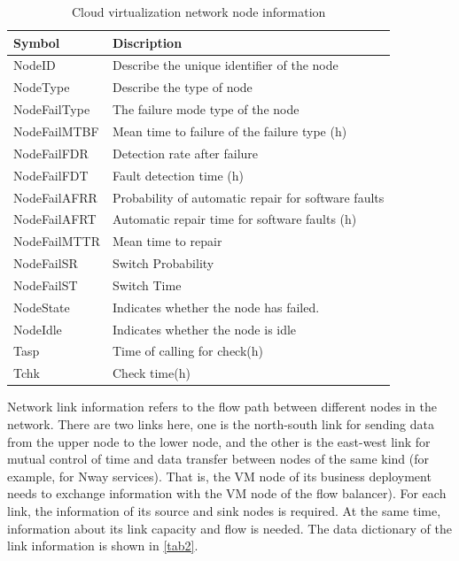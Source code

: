 \documentclass[journal]{IEEEtran}
\begin{document}
    \begin{table}[!t]
        \renewcommand{\arraystretch}{1.3}
        \caption{Cloud virtualization network node information}
        \label{tab1}
        \centering
        \begin{tabular}{|l||l|}
            \hline
            Symbol       & Discription                                         \\
            \hline
            NodeID       & Describe the unique identifier of the node          \\
            NodeType     & Describe the type of node                           \\
            NodeFailType & The failure mode type of the node                   \\
            NodeFailMTBF & Mean time to failure of the failure type (h)        \\
            NodeFailFDR  & Detection rate after failure                        \\
            NodeFailFDT  & Fault detection time (h)                            \\
            NodeFailAFRR & Probability of automatic repair for software faults \\
            NodeFailAFRT & Automatic repair time for software faults (h)       \\
            NodeFailMTTR & Mean time to repair                                 \\
            NodeFailSR   & Switch Probability                                  \\
            NodeFailST   & Switch Time                                         \\
            NodeState    & Indicates whether the node has failed.              \\
            NodeIdle     & Indicates whether the node is idle                  \\
            Tasp         & Time of calling for check(h)                        \\
            Tchk         & Check time(h)                                       \\
            \hline
        \end{tabular}
    \end{table}

    Network link information refers to the flow path between different nodes in the network. There are two links here, one is the north-south link for sending data from the upper node to the lower node, and the other is the east-west link for mutual control of time and data transfer between nodes of the same kind (for example, for Nway services). That is, the VM node of its business deployment needs to exchange information with the VM node of the flow balancer). For each link, the information of its source and sink nodes is required. At the same time, information about its link capacity and flow is needed. The data dictionary of the link information is shown in \ref{tab2}.
\end{document}
